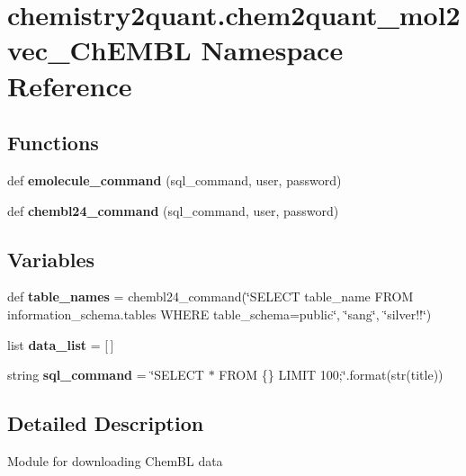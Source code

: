 \hypertarget{namespacechemistry2quant_1_1chem2quant__mol2vec__ChEMBL}{}\section{chemistry2quant.\+chem2quant\+\_\+mol2vec\+\_\+\+Ch\+E\+M\+BL Namespace Reference}
\label{namespacechemistry2quant_1_1chem2quant__mol2vec__ChEMBL}
\subsection*{Functions}
\begin{DoxyCompactItemize}
\item
\mbox{\label{namespacechemistry2quant_1_1chem2quant__mol2vec__ChEMBL_add9e61c975d21bd982eefedd74eddef5}}
def {\bfseries emolecule\+\_\+command} (sql\+\_\+command, user, password)
\item
\mbox{\label{namespacechemistry2quant_1_1chem2quant__mol2vec__ChEMBL_a39a4a7753d552853870c7cc34f64629e}}
def {\bfseries chembl24\+\_\+command} (sql\+\_\+command, user, password)
\end{DoxyCompactItemize}
\subsection*{Variables}
\begin{DoxyCompactItemize}
\item
\mbox{\label{namespacechemistry2quant_1_1chem2quant__mol2vec__ChEMBL_ae760e712fcb5866e01a5bb2413d1caed}}
def {\bfseries table\+\_\+names} = chembl24\+\_\+command(\char`\"{}S\+E\+L\+E\+CT table\+\_\+name F\+R\+OM information\+\_\+schema.\+tables W\+H\+E\+RE table\+\_\+schema=\textquotesingle{}public\textquotesingle{}\char`\"{}, \char`\"{}sang\char`\"{}, \char`\"{}silver!!\char`\"{})
\item
\mbox{\label{namespacechemistry2quant_1_1chem2quant__mol2vec__ChEMBL_a9d78733df97662c23dcef1708f10272f}}
list {\bfseries data\+\_\+list} = \mbox{[}$\,$\mbox{]}
\item
\mbox{\label{namespacechemistry2quant_1_1chem2quant__mol2vec__ChEMBL_a1bc34f7a1563c700e2d1e074b8be7483}}
string {\bfseries sql\+\_\+command} = \char`\"{}S\+E\+L\+E\+CT $\ast$ F\+R\+OM \{\} L\+I\+M\+IT 100;\char`\"{}.format(str(title))
\end{DoxyCompactItemize}


\subsection{Detailed Description}
\begin{DoxyVerb}Module for downloading ChemBL data \end{DoxyVerb}
